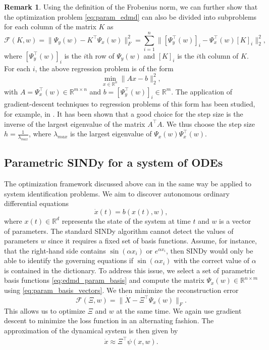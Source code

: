 \documentclass
[
    a4paper,
    DIV=11,
    abstract=true,
    11pt,
]
{scrartcl}
\newcommand{\R}{\mathbb{R}}                                      %
\theoremstyle{definition}
\newtheorem{remark}[theorem]{Remark}
\begin{document}
\begin{remark}
Using the definition of the Frobenius norm, we can further show that the optimization problem \eqref{eq:param_edmd} can also be divided into subproblems for each column of the matrix $ K $ as
\begin{equation*}
    \mathcal{F}(K, w) =\big\| \Psi_y(w) - K^{\top}\Psi_x(w) \big\|^2_F = \sum_{i=1}^n \big\| [\Psi_y^{\top}(w)]_{i} - \Psi_x^{\top}(w) [K]_{i}\big\|_2^2,
\end{equation*}
where $[\Psi_y^{\top}(w)]_{i}$ is the $i$th row of $\Psi_y(w)$ and $[K]_i$ is the $i$th column of $K$. For each $i$, the above regression problem is of the form
\begin{equation*}
    \min_{x \in \R^n} \big\|Ax - b\big\|_2^2,
\end{equation*}
with $A = \Psi_x^{\top}(w) \in \mathbb{R}^{m \times n}$ and $b = [\Psi_y^{\top}(w)]_{i} \in \mathbb{R}^m$. The application of gradient-descent techniques to regression problems of this form has been studied, for example, in \cite{nesterov2018lectures}. It has been shown that a good choice for the step size is the inverse of the largest eigenvalue of the matrix $A^{\top} A$. We thus choose the step size $h = \frac{1}{\lambda_{max}}$, where $\lambda_{max}$ is the largest eigenvalue of $\Psi_x(w) \Psi_x^{\top}(w)$.
\end{remark}

\subsection{Parametric SINDy for a system of ODEs}

The optimization framework discussed above can in the same way be applied to system identification problems. We aim to discover autonomous ordinary differential equations
\begin{equation*}
    \dot{x}(t) = b(x(t), w),
\end{equation*}
where $x(t) \in \R^d$ represents the state of the system at time $t$ and $w$ is a vector of parameters. The standard SINDy algorithm cannot detect the values of parameters $w$ since it requires a fixed set of basis functions. Assume, for instance, that the right-hand side contains $ \sin(\alpha x_i) $ or $ e^{\alpha x_i} $, then SINDy would only be able to identify the governing equations if $ \sin(\alpha x_i) $ with the correct value of $\alpha$ is contained in the dictionary. To address this issue, we select a set of parametric basis functions \eqref{eq:edmd_param_basis} and compute the matrix $\Psi_x(w) \in \mathbb{R}^{n \times m}$ using \eqref{eq:param_basis_vectors}. We then minimize the reconstruction error
\begin{equation} \label{eq:param_sindy}
    \mathcal{F}(\Xi, w) = \big\|\dot{X} - \Xi^{\top}\Psi_x(w)\big\|_F.
\end{equation}
This allows us to optimize $\Xi$ and $w$ at the same time. We again use gradient descent to minimize the loss function in an alternating fashion. The approximation of the dynamical system is then given by
\begin{align*}
    \dot{x} \approx \Xi^{\top} \psi(x, w).
\end{align*}
\end{document}
